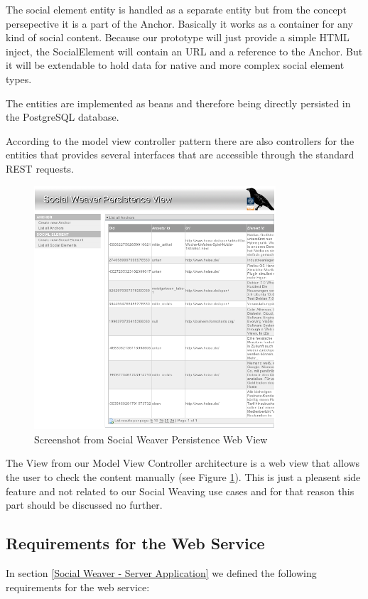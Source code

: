 The social element entity is handled as a separate entity but from the concept persepective it is a part of the Anchor. Basically it works as a container for any kind of social content. Because our prototype will just provide a simple HTML inject, the SocialElement will contain an URL and a reference to the Anchor. But it will be extendable to hold data for native and more complex social element types. 

The entities are implemented as beans and therefore being directly persisted in the PostgreSQL database.

According to the model view controller pattern there are also controllers for the entities that provides several interfaces that are accessible through the standard REST requests. 

\begin{figure}[h!] \centering
		\includegraphics[width=9cm]{images/sowe-mvc-view-screenshot.png}
		\caption{Screenshot from Social Weaver Persistence Web View}
		\label{sowe-mvc-view-screenshot}
\end{figure} 

The View from our Model View Controller architecture is a web view that allows the user to check the content manually (see Figure \ref{sowe-mvc-view-screenshot}). This is just a pleasent side feature and not related to our Social Weaving use cases and for that reason this part should be discussed no further.


\subsection{Requirements for the Web Service}
In section \ref{Social Weaver - Server Application} we defined the following requirements for the web service:


